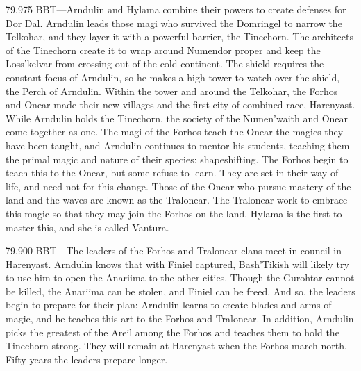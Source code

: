 \documentclass[smalldemyvopaper,11pt,twoside,onecolumn,openright,extrafontsizes]{memoir}
\begin{document}
{{79,975 BBT—Arndulin and Hylama combine their powers to create defenses for Dor Dal. Arndulin leads those magi who survived the Domringel to narrow the Telkohar, and they layer it with a powerful barrier, the Tinechorn. The architects of the Tinechorn create it to wrap around Numendor proper and keep the Loss’kelvar from crossing out of the cold continent. The shield requires the constant focus of Arndulin, so he makes a high tower to watch over the shield, the Perch of Arndulin. Within the tower and around the Telkohar, the Forhos and Onear made their new villages and the first city of combined race, Harenyast. While Arndulin holds the Tinechorn, the society of the Numen’waith and Onear come together as one. The magi of the Forhos teach the Onear the magics they have been taught, and Arndulin continues to mentor his students, teaching them the primal magic and nature of their species: shapeshifting. The Forhos begin to teach this to the Onear, but some refuse to learn. They are set in their way of life, and need not for this change. Those of the Onear who pursue mastery of the land and the waves are known as the Tralonear. The Tralonear work to embrace this magic so that they may join the Forhos on the land. Hylama is the first to master this, and she is called Vantura.

79,900 BBT—The leaders of the Forhos and Tralonear clans meet in council in Harenyast. Arndulin knows that with Finiel captured, Bash’Tikish will likely try to use him to open the Anariima to the other cities. Though the Gurohtar cannot be killed, the Anariima can be stolen, and Finiel can be freed. And so, the leaders begin to prepare for their plan: Arndulin learns to create blades and arms of magic, and he teaches this art to the Forhos and Tralonear. In addition, Arndulin picks the greatest of the Areil among the Forhos and teaches them to hold the Tinechorn strong. They will remain at Harenyast when the Forhos march north. Fifty years the leaders prepare longer.

}}
\end{document}

